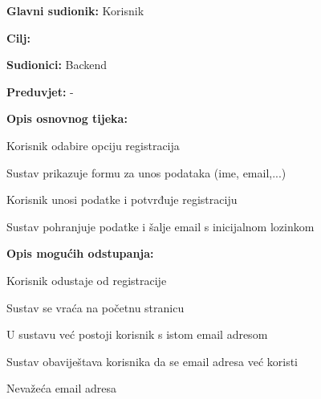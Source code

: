 					\noindent {}
					\begin{packed_item}
	
						\item \textbf{Glavni sudionik: } Korisnik
						\item  \textbf{Cilj:} 
						\item  \textbf{Sudionici:} Backend
						\item  \textbf{Preduvjet:} -
						\item  \textbf{Opis osnovnog tijeka:}  
						
						\item[] \begin{packed_enum}
	
							\item Korisnik odabire opciju registracija
							\item Sustav prikazuje formu za unos podataka (ime, email,...)
							\item Korisnik unosi podatke i potvrđuje registraciju
							\item Sustav pohranjuje podatke i šalje email s inicijalnom lozinkom
							
						\end{packed_enum}
						
						\item  \textbf{Opis mogućih odstupanja:}
						
						\item[] \begin{packed_item}
	
							\item[3.a] Korisnik odustaje od registracije
							\item[] \begin{packed_enum}
								
								\item Sustav se vraća na početnu stranicu
								
							\end{packed_enum}
							\item[4.a] U sustavu već postoji korisnik s istom email adresom
							\item[] \begin{packed_enum}
								
								\item Sustav obaviještava korisnika da se email adresa već koristi
								
							\end{packed_enum}
							\item[4.b] Nevažeća email adresa

						\end{packed_item}
					\end{packed_item}
					
